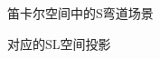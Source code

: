 \begin{subfigure}[b]{0.48\textwidth}
  \centering
  \caption{笛卡尔空间中的S弯道场景}
\end{subfigure}
\hfill
\begin{subfigure}[b]{0.48\textwidth}
  \centering
  \caption{对应的SL空间投影}
\end{subfigure}
